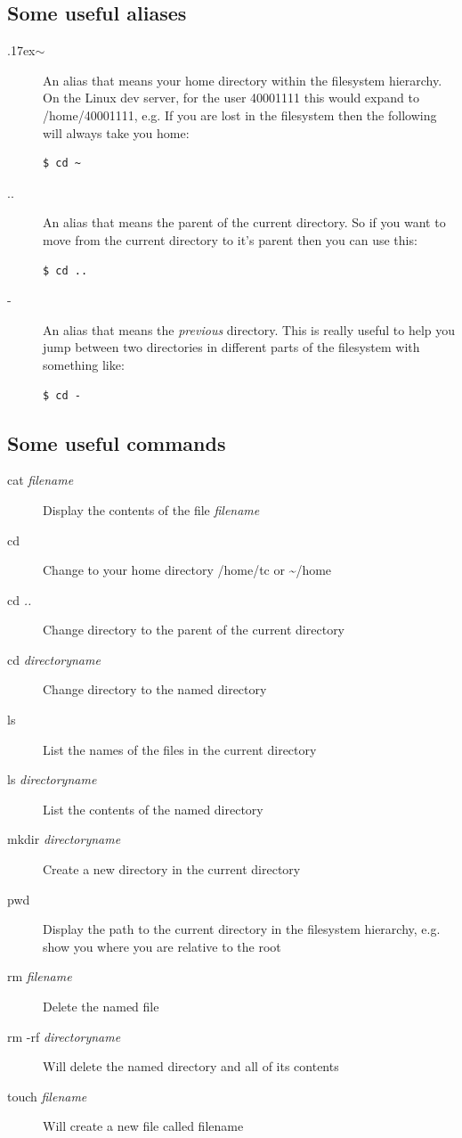 \documentclass[12pt, a4paper, oneside]{book}
\begin{document}
\subsection{Some useful aliases}

\begin{description}
\item[{\raise.17ex\hbox{$\scriptstyle\sim$}}] An alias that means your home directory within the filesystem hierarchy. On the Linux dev server, for the user 40001111 this would expand to /home/40001111, e.g. If you are lost in the filesystem then the following will always take you home:
\begin{lstlisting}[style=DOS]
    $ cd ~
\end{lstlisting}

\item[..] An alias that means the parent of the current directory. So if you want to move from the current directory to it's parent then you can use this:
\begin{lstlisting}[style=DOS]
    $ cd ..
\end{lstlisting}

\item[-] An alias that means the \emph{previous} directory. This is really useful to help you jump between two directories in different parts of the filesystem with something like:
\begin{lstlisting}[style=DOS]
    $ cd -
\end{lstlisting}

\end{description}

\subsection{Some useful commands}
\begin{description}
\item[cat \emph{filename}] Display the contents of the file \emph{filename}
\item[cd] Change to your home directory /home/tc or \textasciitilde/home
\item[cd \emph{..}] Change directory to the parent of the current directory
\item[cd \emph{directoryname}] Change directory to the named directory
\item[ls] List the names of the files in the current directory
\item[ls  \emph{directoryname}] List the contents of the named directory
\item[mkdir \emph{directoryname}] Create a new directory in the current directory
\item[pwd] Display the path to the current directory in the filesystem hierarchy, e.g. show you where you are relative to the root
\item[rm \emph{filename}] Delete the named file
\item[rm -rf \emph{directoryname}] Will delete the named directory and all of its contents
\item[touch \emph{filename}] Will create a new file called filename
\end{description}
\end{document}

